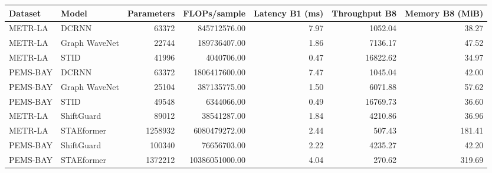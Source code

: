 \begin{tabular}{llrrrrr}
\toprule
Dataset & Model & Parameters & FLOPs/sample & Latency B1 (ms) & Throughput B8 & Memory B8 (MiB) \\
\midrule
METR-LA & DCRNN & 63372 & 845712576.00 & 7.97 & 1052.04 & 38.27 \\
METR-LA & Graph WaveNet & 22744 & 189736407.00 & 1.86 & 7136.17 & 47.52 \\
METR-LA & STID & 41996 & 4040706.00 & 0.47 & 16822.62 & 34.97 \\
PEMS-BAY & DCRNN & 63372 & 1806417600.00 & 7.47 & 1045.04 & 42.00 \\
PEMS-BAY & Graph WaveNet & 25104 & 387135775.00 & 1.50 & 6071.88 & 57.62 \\
PEMS-BAY & STID & 49548 & 6344066.00 & 0.49 & 16769.73 & 36.60 \\
METR-LA & ShiftGuard & 89012 & 38541287.00 & 1.84 & 4210.86 & 36.96 \\
METR-LA & STAEformer & 1258932 & 6080479272.00 & 2.44 & 507.43 & 181.41 \\
PEMS-BAY & ShiftGuard & 100340 & 76656703.00 & 2.22 & 4235.27 & 42.20 \\
PEMS-BAY & STAEformer & 1372212 & 10386051000.00 & 4.04 & 270.62 & 319.69 \\
\bottomrule
\end{tabular}
